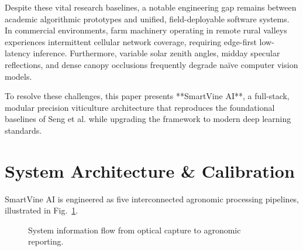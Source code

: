 \documentclass[conference]{IEEEtran}
\begin{document}
Despite these vital research baselines, a notable engineering gap remains between academic algorithmic prototypes and unified, field-deployable software systems. In commercial environments, farm machinery operating in remote rural valleys experiences intermittent cellular network coverage, requiring edge-first low-latency inference. Furthermore, variable solar zenith angles, midday specular reflections, and dense canopy occlusions frequently degrade naïve computer vision models.

To resolve these challenges, this paper presents **SmartVine AI**, a full-stack, modular precision viticulture architecture that reproduces the foundational baselines of Seng et al. while upgrading the framework to modern deep learning standards.

\section{System Architecture \& Calibration}
SmartVine AI is engineered as five interconnected agronomic processing pipelines, illustrated in Fig.~\ref{fig:architecture}.

\begin{figure}[htbp]
\centerline{}
\caption{System information flow from optical capture to agronomic reporting.}
\label{fig:architecture}
\end{figure}
\end{document}
